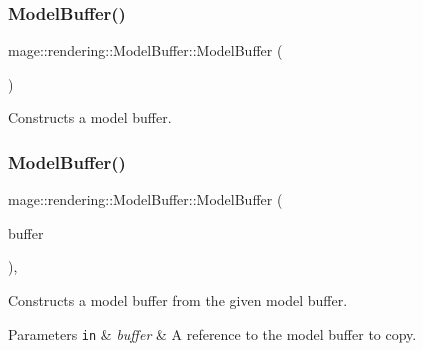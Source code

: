 \subsubsection{\texorpdfstring{Model\+Buffer()}{ModelBuffer()}\hspace{0.1cm}{\footnotesize\ttfamily [1/3]}}
{\footnotesize\ttfamily mage\+::rendering\+::\+Model\+Buffer\+::\+Model\+Buffer (\begin{DoxyParamCaption}{ }\end{DoxyParamCaption})\hspace{0.3cm}{\ttfamily [noexcept]}}

Constructs a model buffer. \mbox{\label{structmage_1_1rendering_1_1_model_buffer_a2a70d56be64cc621e61e056fb08d6905}} 
\subsubsection{\texorpdfstring{Model\+Buffer()}{ModelBuffer()}\hspace{0.1cm}{\footnotesize\ttfamily [2/3]}}
{\footnotesize\ttfamily mage\+::rendering\+::\+Model\+Buffer\+::\+Model\+Buffer (\begin{DoxyParamCaption}\item[{const \mbox{\hyperlink{structmage_1_1rendering_1_1_model_buffer}{Model\+Buffer}} \&}]{buffer }\end{DoxyParamCaption})\hspace{0.3cm}{\ttfamily [default]}, {\ttfamily [noexcept]}}

Constructs a model buffer from the given model buffer.


\begin{DoxyParams}[1]{Parameters}
\mbox{\tt in}  & {\em buffer} & A reference to the model buffer to copy. \\
\hline
\end{DoxyParams}
\mbox{\label{structmage_1_1rendering_1_1_model_buffer_aa562199c2433c47baabaf32743b1a124}} 

